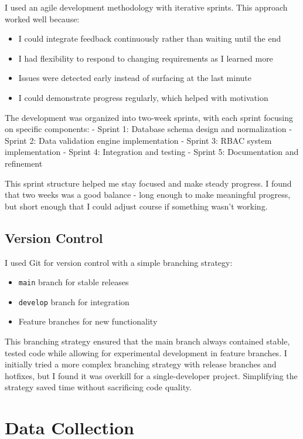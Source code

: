 I used an agile development methodology with iterative sprints. This approach worked well because:

\begin{itemize}
    \item I could integrate feedback continuously rather than waiting until the end
    \item I had flexibility to respond to changing requirements as I learned more
    \item Issues were detected early instead of surfacing at the last minute
    \item I could demonstrate progress regularly, which helped with motivation
\end{itemize}

The development was organized into two-week sprints, with each sprint focusing on specific components:
- Sprint 1: Database schema design and normalization
- Sprint 2: Data validation engine implementation
- Sprint 3: RBAC system implementation
- Sprint 4: Integration and testing
- Sprint 5: Documentation and refinement

This sprint structure helped me stay focused and make steady progress. I found that two weeks was a good balance - long enough to make meaningful progress, but short enough that I could adjust course if something wasn't working.

\subsection{Version Control}

I used Git for version control with a simple branching strategy:

\begin{itemize}
    \item \texttt{main} branch for stable releases
    \item \texttt{develop} branch for integration
    \item Feature branches for new functionality
\end{itemize}

This branching strategy ensured that the main branch always contained stable, tested code while allowing for experimental development in feature branches. I initially tried a more complex branching strategy with release branches and hotfixes, but I found it was overkill for a single-developer project. Simplifying the strategy saved time without sacrificing code quality.

\section{Data Collection}

